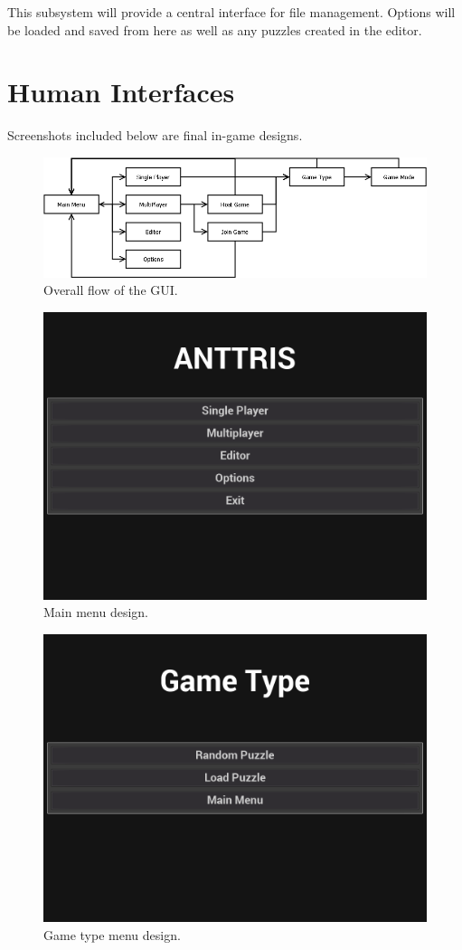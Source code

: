 \documentclass[12pt]{article}
\begin{document}
This subsystem will provide a central interface for file management. Options will be loaded and saved from here as well as any puzzles created in the editor.
\section{Human Interfaces} %
Screenshots included below are final in-game designs.
	\begin{figure}[H]
        \centering
        \includegraphics[width=4.5in]{Anttris_MenuFlow.png}
        \caption{Overall flow of the GUI.}
    \end{figure}
    \begin{figure}[H]
        \centering
        \includegraphics[width=4.5in]{Anttris_MainMenu.png}
        \caption{Main menu design.}
    \end{figure}
    \begin{figure}[H]
        \centering
        \includegraphics[width=4.5in]{Anttris_GTMenu.png}
        \caption{Game type menu design.}
    \end{figure}
\end{document}
